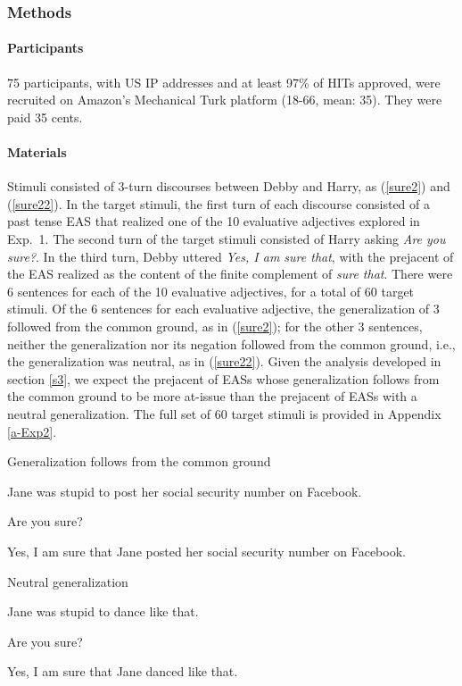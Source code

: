 \documentclass[11pt,fleqn]{article}
\newcommand{\6}{\mbox{$[\hspace*{-.6mm}[$}}
\newcommand{\9}{\mbox{$]\hspace*{-.6mm}]$}}
\begin{document}
\subsubsection{Methods}

\paragraph{Participants} 75 participants, with US IP addresses and at least 97\% of HITs approved, were recruited on Amazon's Mechanical Turk platform (18-66, mean: 35). They were paid 35 cents.

\paragraph{Materials} Stimuli consisted of 3-turn discourses between Debby and Harry, as (\ref{sure2}) and (\ref{sure22}). In the target stimuli, the first turn of each discourse consisted of a past tense EAS that realized one of the 10 evaluative adjectives explored in Exp.~1. The second turn of the target stimuli consisted of Harry asking {\em Are you sure?}. In the third turn, Debby uttered {\em Yes, I am sure that}, with the prejacent of the EAS realized as the content of the finite complement of {\em sure that}. There were 6 sentences for each of the 10 evaluative adjectives, for a total of 60 target stimuli. Of the 6 sentences for each evaluative adjective, the generalization of 3 followed from the common ground, as in (\ref{sure2}); for the other 3 sentences, neither the generalization nor its negation followed from the common ground, i.e., the generalization was neutral, as in (\ref{sure22}). Given the analysis developed in section \ref{s3}, we expect the prejacent of EASs whose generalization follows from the common ground to be more at-issue than the prejacent of EASs with a neutral generalization. The full set of 60 target stimuli is provided in Appendix \ref{a-Exp2}.

\begin{exe}
\ex\label{sure2} Generalization follows from the common ground
\begin{xlist}
 Jane was stupid to post her social security number on Facebook. 

 Are you sure?

 Yes, I am sure that Jane posted her social security number on Facebook.
\end{xlist}

\ex\label{sure22} Neutral generalization
\begin{xlist}
 Jane was stupid to dance like that. 

 Are you sure?

 Yes, I am sure that Jane danced like that.
\end{xlist}
\end{exe}
\end{document}
